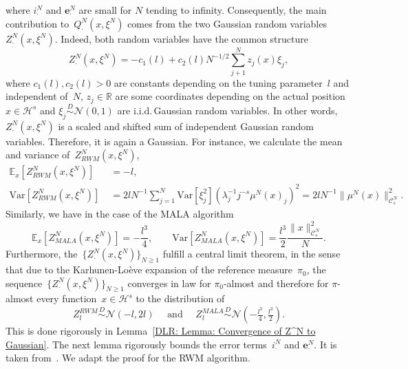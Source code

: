 where $i^N_{\cdot}$ and $\textbf{e}^N_{\cdot}$ are small for $N$ tending to infinity.  Consequently, the main contribution to~$Q^N_{\cdot}(x, \xi^N)$ comes from the two Gaussian random variables~$Z^N_{\cdot} (x, \xi^N)$. Indeed, both random variables have the common structure
\begin{equation*}
  Z^N_{\cdot} (x, \xi^N)  = - c_1(l) + c_2(l) N^{-1/2} \sum_{j+1}^N z_j(x) \xi_j,
\end{equation*}
where $c_1(l), c_2(l) > 0 $ are constants depending on the tuning parameter~$l$ and independent of~$N$, $z_j \in \mathbb{R}$ are some coordinates depending on the actual position~$x \in \mathcal{H}^s$ and $\xi_j  \stackrel{D}{\sim} \mathcal{N}(0, 1)$ are i.i.d.\,Gaussian random variables. In other words, $Z^N_{\cdot} (x, \xi^N)$ is a scaled and shifted sum of independent Gaussian random variables. Therefore, it is again a Gaussian. For instance, we calculate the mean and variance of~$Z^N_{RWM} (x, \xi^N)$,
\begin{equation}
  \label{DLR: Gaussian mean and variance of Z^N RWM}
  \begin{split}
  \mathbb{E}_x[Z^N_{RWM} (x, \xi^N)] & \;= - l, \\
  \text{Var}[Z^N_{RWM} (x, \xi^N)] & \; = 2l N^{-1} \sum_{j=1}^N \text{Var}[\xi_j^2]( \lambda_j^{-1} j^{-s} \mu^N(x)_j)^2 =  2l N^{-1} \|\mu^N(x)\|_{\mathcal{C}_s^N}^2.
  \end{split}
\end{equation}
Similarly, we have in the case of the MALA algorithm
\begin{equation*}
  \mathbb{E}_x[Z^N_{MALA} (x, \xi^N)] = - \frac{l^3}{4}, \qquad \text{Var}[Z^N_{MALA} (x, \xi^N)]  = \frac{l^3}{2} \frac{\|x\|_{\mathcal{C}^N_s}^2}{N}.
\end{equation*}
Furthermore, the~$\{Z^N_{\cdot} (x, \xi^N) \}_{N\geq1}$ fulfill a central limit theorem, in the sense that due to the Karhunen-Lo\`{e}ve expansion of the reference measure~$\pi_0$, the sequence~$\{Z^N_{\cdot} (x, \xi^N) \}_{N\geq1}$ converges in law for $\pi_0$-almost and therefore for $\pi$-almost every function~$x \in \mathcal{H}^s$ to the distribution of
\begin{equation}
  \label{DLR: Claim Convergence of Z^N to Gaussian}
  Z_l^{RWM} \stackrel{D}{\sim} \mathcal{N}(- l, 2l) \quad \text{ and } \quad Z_l^{MALA} \stackrel{D}{\sim} \mathcal{N}(- \tfrac{l^3}{4}, \tfrac{l^3}{2}).
\end{equation}
This is done rigorously in Lemma~\ref{DLR: Lemma: Convergence of Z^N to Gaussian}. The next lemma rigorously bounds the error terms~$i^N_{\cdot}$ and $\textbf{e}^N_{\cdot}$. It is taken from~\autocite[Lemma 4.4]{Pillai2012}. We adapt the proof for the RWM algorithm.

